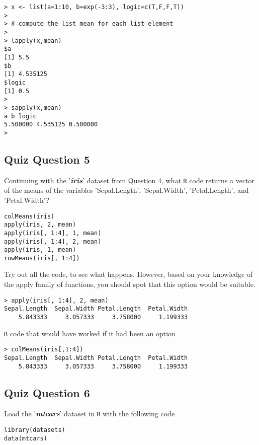 \documentclass[12pt]{article}
\begin{document}
\begin{verbatim}
> x <- list(a=1:10, b=exp(-3:3), logic=c(T,F,F,T))
>
> # compute the list mean for each list element
>
> lapply(x,mean)
$a
[1] 5.5
$b
[1] 4.535125
$logic
[1] 0.5
>
> sapply(x,mean)
a b logic
5.500000 4.535125 0.500000
>
\end{verbatim}

\newpage
\subsection*{Quiz Question 5} %
Continuing with the '\textit{\textbf{iris}}' dataset from Question 4, what \texttt{R} code returns a vector of the means of the variables 'Sepal.Length', 'Sepal.Width', 'Petal.Length', and 'Petal.Width'?
\begin{framed}
\begin{verbatim}
colMeans(iris)
apply(iris, 2, mean)
apply(iris[, 1:4], 1, mean)
apply(iris[, 1:4], 2, mean)
apply(iris, 1, mean)
rowMeans(iris[, 1:4])
\end{verbatim}
\end{framed}
Try out all the code, to see what happens. However, based on your knowledge of the apply family of functions, you should spot that this option would be suitable.
\begin{verbatim}
> apply(iris[, 1:4], 2, mean)
Sepal.Length  Sepal.Width Petal.Length  Petal.Width 
    5.843333     3.057333     3.758000     1.199333 
\end{verbatim}

\noindent \texttt{R} code that would have worked if it had been an option

\begin{verbatim}
> colMeans(iris[,1:4])
Sepal.Length  Sepal.Width Petal.Length  Petal.Width 
    5.843333     3.057333     3.758000     1.199333
\end{verbatim}


\newpage
\subsection{Quiz Question 6}
Load the '\textit{\textbf{mtcars}}' dataset in \texttt{R} with the following code

\begin{framed}
\begin{verbatim}
library(datasets)
data(mtcars)
\end{verbatim}
\end{framed}
\end{document}

